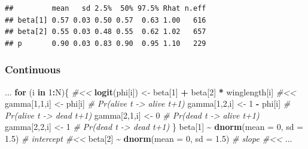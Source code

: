 \documentclass[
  12pt,
]{krantz}
\newenvironment{Shaded}{\begin{snugshade}}{\end{snugshade}}
\newcommand{\AttributeTok}[1]{\textcolor[rgb]{0.13,0.29,0.53}{#1}}
\newcommand{\CommentTok}[1]{\textcolor[rgb]{0.56,0.35,0.01}{\textit{#1}}}
\newcommand{\ControlFlowTok}[1]{\textcolor[rgb]{0.13,0.29,0.53}{\textbf{#1}}}
\newcommand{\DecValTok}[1]{\textcolor[rgb]{0.00,0.00,0.81}{#1}}
\newcommand{\FloatTok}[1]{\textcolor[rgb]{0.00,0.00,0.81}{#1}}
\newcommand{\FunctionTok}[1]{\textcolor[rgb]{0.13,0.29,0.53}{\textbf{#1}}}
\newcommand{\NormalTok}[1]{#1}
\newcommand{\OtherTok}[1]{\textcolor[rgb]{0.56,0.35,0.01}{#1}}
\newcommand{\SpecialCharTok}[1]{\textcolor[rgb]{0.81,0.36,0.00}{\textbf{#1}}}
\begin{document}
\begin{verbatim}
##         mean   sd 2.5%  50% 97.5% Rhat n.eff
## beta[1] 0.57 0.03 0.50 0.57  0.63 1.00   616
## beta[2] 0.55 0.03 0.48 0.55  0.62 1.02   657
## p       0.90 0.03 0.83 0.90  0.95 1.10   229
\end{verbatim}

\hypertarget{continuous-1}{%
\subsubsection{Continuous}\label{continuous-1}}

\begin{Shaded}
\begin{Highlighting}[]
\NormalTok{...}
  \ControlFlowTok{for}\NormalTok{ (i }\ControlFlowTok{in} \DecValTok{1}\SpecialCharTok{:}\NormalTok{N)\{ }\CommentTok{\#\textless{}\textless{}}
    \FunctionTok{logit}\NormalTok{(phi[i]) }\OtherTok{\textless{}{-}}\NormalTok{ beta[}\DecValTok{1}\NormalTok{] }\SpecialCharTok{+}\NormalTok{ beta[}\DecValTok{2}\NormalTok{] }\SpecialCharTok{*}\NormalTok{ winglength[i] }\CommentTok{\#\textless{}\textless{}}
\NormalTok{    gamma[}\DecValTok{1}\NormalTok{,}\DecValTok{1}\NormalTok{,i] }\OtherTok{\textless{}{-}}\NormalTok{ phi[i]      }\CommentTok{\# Pr(alive t {-}\textgreater{} alive t+1)}
\NormalTok{    gamma[}\DecValTok{1}\NormalTok{,}\DecValTok{2}\NormalTok{,i] }\OtherTok{\textless{}{-}} \DecValTok{1} \SpecialCharTok{{-}}\NormalTok{ phi[i]  }\CommentTok{\# Pr(alive t {-}\textgreater{} dead t+1)}
\NormalTok{    gamma[}\DecValTok{2}\NormalTok{,}\DecValTok{1}\NormalTok{,i] }\OtherTok{\textless{}{-}} \DecValTok{0}        \CommentTok{\# Pr(dead t {-}\textgreater{} alive t+1)}
\NormalTok{    gamma[}\DecValTok{2}\NormalTok{,}\DecValTok{2}\NormalTok{,i] }\OtherTok{\textless{}{-}} \DecValTok{1}        \CommentTok{\# Pr(dead t {-}\textgreater{} dead t+1)}
\NormalTok{  \}}
\NormalTok{  beta[}\DecValTok{1}\NormalTok{] }\SpecialCharTok{\textasciitilde{}} \FunctionTok{dnorm}\NormalTok{(}\AttributeTok{mean =} \DecValTok{0}\NormalTok{, }\AttributeTok{sd =} \FloatTok{1.5}\NormalTok{) }\CommentTok{\# intercept \#\textless{}\textless{}}
\NormalTok{  beta[}\DecValTok{2}\NormalTok{] }\SpecialCharTok{\textasciitilde{}} \FunctionTok{dnorm}\NormalTok{(}\AttributeTok{mean =} \DecValTok{0}\NormalTok{, }\AttributeTok{sd =} \FloatTok{1.5}\NormalTok{) }\CommentTok{\# slope \#\textless{}\textless{}}
\NormalTok{...}
\end{Highlighting}
\end{Shaded}
\end{document}
